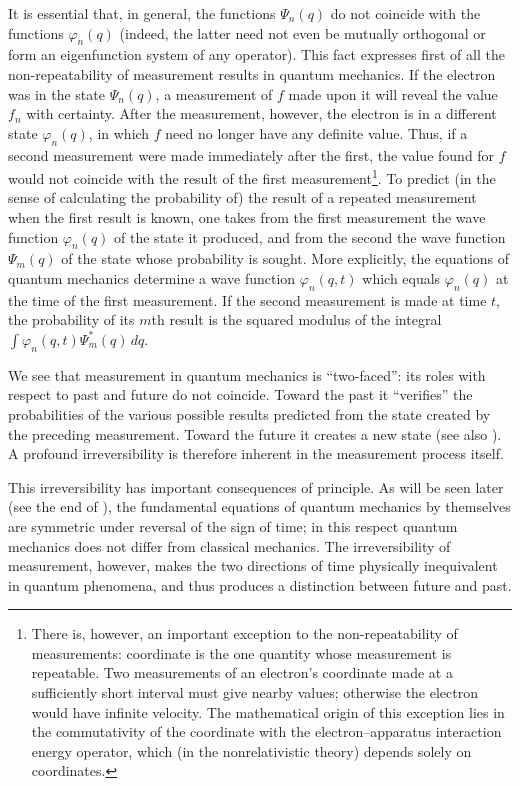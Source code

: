 It is essential that, in general, the functions $\Psi_n(q)$ do not coincide
with the functions $\varphi_n(q)$ (indeed, the latter need not even be
mutually orthogonal or form an eigenfunction system of any operator). This
fact expresses first of all the non-repeatability of measurement results in
quantum mechanics. If the electron was in the state $\Psi_n(q)$, a measurement
of $f$ made upon it will reveal the value $f_n$ with certainty. After the
measurement, however, the electron is in a different state $\varphi_n(q)$, in
which $f$ need no longer have any definite value. Thus, if a second
measurement were made immediately after the first, the value found for $f$
would not coincide with the result of the first
measurement\footnote{There is, however, an important exception to the
non-repeatability of measurements: coordinate is the one quantity whose
measurement is repeatable. Two measurements of an electron's coordinate made
at a sufficiently short interval must give nearby values; otherwise the
electron would have infinite velocity. The mathematical origin of this
exception lies in the commutativity of the coordinate with the
electron--apparatus interaction energy operator, which (in the nonrelativistic
theory) depends solely on
coordinates.}. To predict (in the sense of%
calculating the probability of) the result of a repeated measurement when the
first result is known, one takes from the first measurement the wave function
$\varphi_n(q)$ of the state it produced, and from the second the wave function
$\Psi_m(q)$ of the state whose probability is sought. More explicitly, the
equations of quantum mechanics determine a wave function
$\varphi_n(q,t)$ which equals $\varphi_n(q)$ at the time of the first
measurement. If the second measurement is made at time $t$, the probability
of its $m$th result is the squared modulus of the integral
$\int\varphi_n(q,t)\Psi_m^*(q)\,dq$.

We see that measurement in quantum mechanics is ``two-faced'': its roles with
respect to past and future do not coincide. Toward the past it ``verifies''
the probabilities of the various possible results predicted from the state
created by the preceding measurement. Toward the future it creates a new
state (see also ). A profound irreversibility is therefore inherent in
the measurement process itself.

This irreversibility has important consequences of principle. As will be seen
later (see the end of ), the fundamental equations of quantum mechanics
by themselves are symmetric under reversal of the sign of time; in this
respect quantum mechanics does not differ from classical mechanics. The
irreversibility of measurement, however, makes the two directions of time
physically inequivalent in quantum phenomena, and thus produces a distinction
between future and past.
